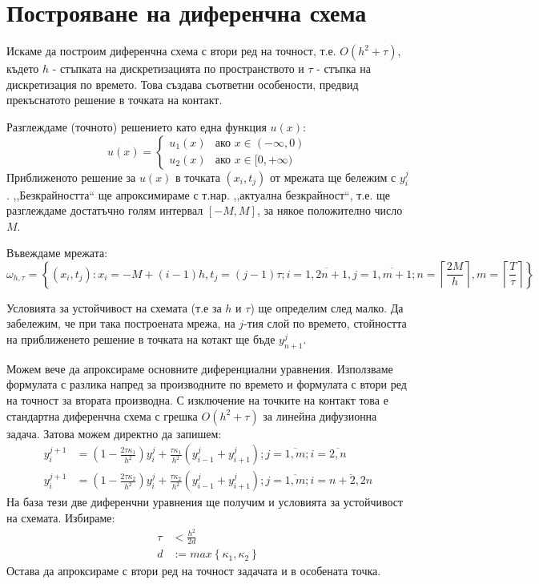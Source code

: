 \section{Построяване на диференчна схема}
Искаме да построим диференчна схема с втори ред на точност, т.е. $O(h^2 + \tau)$, където $h$ - стъпката на дискретизацията по пространството и $\tau$  - стъпка на дискретизация по времето.
Това създава съответни особености, предвид прекъснатото решение в точката на контакт.

\noindent Разглеждаме (точното) решението като една функция $u(x)$:
\begin{equation}
	u(x)=
	\begin{cases}
		u_1(x) & \text{ако } x \in (-\infty, 0) \\
		u_2(x) & \text{ако } x \in [0, +\infty) 
	\end{cases}
\end{equation}
Приближеното решение за $u(x)$ в точката $(x_i, t_j)$ от мрежата ще бележим с $y_{i}^{j}$. ,,Безкрайността`` ще апроксимираме с т.нар. ,,актуална безкрайност``, т.е. ще разглеждаме достатъчно голям интервал $[-M, M]$, за някое положително число $M$.

\noindent Въвеждаме мрежата:
\begin{equation*}
	\omega_{h, \tau } = \left\{ (x_i, t_j):  x_i = -M + (i-1) h, t_j = (j-1) \tau; i = \overline{1,2n+1}, j = \overline{1,m+1};  n = \left\lceil \frac{2M}{h} \right\rceil, m =\left\lceil \frac{T}{\tau} \right\rceil \right\}
\end{equation*}

\noindent Условията за устойчивост на схемата (т.е за $h$ и $\tau$) ще определим след малко.
Да забележим, че при така построената мрежа, на $j$-тия слой по времето, стойността на приближенето решение в точката на котакт ще бъде $y_{n+1}^j$.

Можем вече да апроксираме основните диференциални уравнения. Използваме формулата с разлика напред за производните по времето и формулата с втори ред на точност за втората производна.
С изключение на точките на контакт това е стандартна диференчна схема с грешка $O(h^2+\tau)$ за линейна дифузионна задача. Затова можем директно да запишем:
\begin{align}
	y_{i}^{j+1} & = \left(1-\frac{2 \tau \kappa_1}{h^2}\right)y_{i}^j + \frac{\tau \kappa_1}{h^2}\left(y_{i-1}^j + y_{i+1}^j\right); j = \overline{1, m}; i  = \overline{2, n}    \\
	y_{i}^{j+1} & = \left(1-\frac{2 \tau \kappa_2}{h^2}\right)y_{i}^j + \frac{\tau \kappa_2}{h^2}\left(y_{i-1}^j + y_{i+1}^j\right); j = \overline{1, m}; i  = \overline{n+2, 2n} 
\end{align}
На база тези две диференчни уравнения ще получим и условията за устойчивост на схемата. Избираме:
\begin{align*}
	\tau & < \frac{h^2}{2 d}                         \\
	d    & := max \left\{\kappa_1, \kappa_2 \right\} 
\end{align*}
Остава да апроксираме с втори ред на точност задачата и в особената точка.


